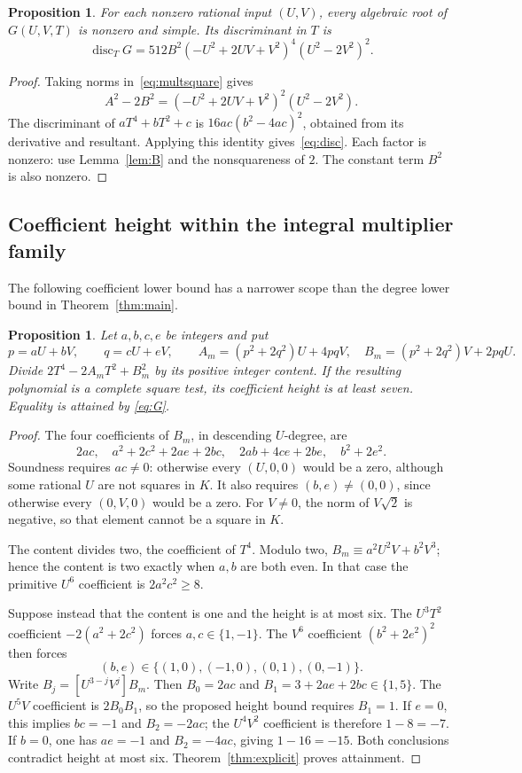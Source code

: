 \documentclass[11pt,a4paper]{article}
\newtheorem{proposition}[theorem]{Proposition}
\DeclareMathOperator{\disc}{disc}
\begin{document}
\begin{proposition}\label{prop:separable}
For each nonzero rational input $(U,V)$, every algebraic root of
$G(U,V,T)$ is nonzero and simple. Its discriminant in $T$ is
\begin{equation}\label{eq:disc}
 \disc_TG=512B^2(-U^2+2UV+V^2)^4(U^2-2V^2)^2.
\end{equation}
\end{proposition}
\begin{proof}
Taking norms in~\eqref{eq:multsquare} gives
\[
        A^2-2B^2=(-U^2+2UV+V^2)^2(U^2-2V^2).
\]
The discriminant of $aT^4+bT^2+c$ is
$16ac(b^2-4ac)^2$, obtained from its derivative and resultant.
Applying this identity gives~\eqref{eq:disc}. Each factor is nonzero:
use Lemma~\ref{lem:B} and the nonsquareness of $2$. The constant
term $B^2$ is also nonzero.
\end{proof}

\subsection{Coefficient height within the integral multiplier family}

The following coefficient lower bound has a narrower scope than
the degree lower bound in Theorem~\ref{thm:main}.

\begin{proposition}\label{prop:height7}
Let $a,b,c,e$ be integers and put
\[
 p=aU+bV,\qquad q=cU+eV,\qquad
 A_m=(p^2+2q^2)U+4pqV,\quad
 B_m=(p^2+2q^2)V+2pqU.
\]
Divide $2T^4-2A_mT^2+B_m^2$ by its positive integer content.
If the resulting polynomial is a complete square test, its
coefficient height is at least seven. Equality is attained by
\eqref{eq:G}.
\end{proposition}
\begin{proof}
The four coefficients of $B_m$, in descending $U$-degree, are
\[
 2ac,\quad a^2+2c^2+2ae+2bc,\quad
 2ab+4ce+2be,\quad b^2+2e^2.
\]
Soundness requires $ac\ne0$: otherwise every $(U,0,0)$ would
be a zero, although some rational $U$ are not squares in $K$.
It also requires $(b,e)\ne(0,0)$, since otherwise every
$(0,V,0)$ would be a zero. For $V\ne0$, the norm of $V\sqrt2$
is negative, so that element cannot be a square in $K$.

The content divides two, the coefficient of $T^4$. Modulo two,
$B_m\equiv a^2U^2V+b^2V^3$; hence the content is two exactly
when $a,b$ are both even. In that case the primitive $U^6$
coefficient is $2a^2c^2\ge8$.

Suppose instead that the content is one and the height is at
most six. The $U^3T^2$ coefficient $-2(a^2+2c^2)$ forces
$a,c\in\{1,-1\}$. The $V^6$ coefficient $(b^2+2e^2)^2$
then forces
\[
 (b,e)\in\{(1,0),(-1,0),(0,1),(0,-1)\}.
\]
Write $B_j=[U^{3-j}V^j]B_m$. Then $B_0=2ac$ and
$B_1=3+2ae+2bc\in\{1,5\}$. The $U^5V$ coefficient is
$2B_0B_1$, so the proposed height bound requires $B_1=1$.
If $e=0$, this implies $bc=-1$ and $B_2=-2ac$; the
$U^4V^2$ coefficient is therefore $1-8=-7$.
If $b=0$, one has $ae=-1$ and $B_2=-4ac$, giving $1-16=-15$.
Both conclusions contradict height at most six.
Theorem~\ref{thm:explicit} proves attainment.
\end{proof}
\end{document}
